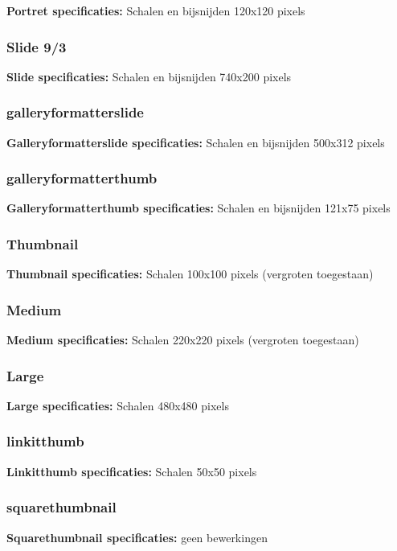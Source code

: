 \textbf{Portret specificaties:} Schalen en bijsnijden 120x120 pixels  


\subsubsection{Slide 9/3}

\textbf{Slide specificaties:} Schalen en bijsnijden 740x200 pixels 


\subsubsection{galleryformatterslide}

\textbf{Galleryformatterslide specificaties:} Schalen en bijsnijden 500x312 pixels 


\subsubsection{galleryformatterthumb}

\textbf{Galleryformatterthumb specificaties:} Schalen en bijsnijden 121x75 pixels  


\subsubsection{Thumbnail}

\textbf{Thumbnail specificaties:} Schalen 100x100 pixels (vergroten toegestaan)


\subsubsection{Medium}

\textbf{Medium specificaties:} Schalen 220x220 pixels (vergroten toegestaan) 


\subsubsection{Large}

\textbf{Large specificaties:} Schalen 480x480 pixels 


\subsubsection{linkitthumb}

\textbf{Linkitthumb specificaties:} Schalen 50x50 pixels 


\subsubsection{squarethumbnail}

\textbf{Squarethumbnail specificaties:} geen bewerkingen 

